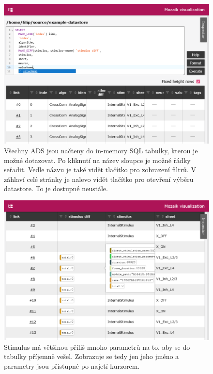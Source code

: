 \begin{figure}
	\centering
	\includegraphics[width=1\linewidth]{img/screenshot_navigator.png}
	\caption{Všechny ADS jsou načteny do in-memory SQL tabulky, kterou je možné dotazovat. Po kliknutí na název sloupce je možné řádky seřadit. Vedle názvu je také vidět tlačítko pro zobrazení filtrů. V záhlaví celé stránky je nalevo vidět tlačítko pro otevření výběru datastore. To je dostupné neustále.}
	\label{fig:navigator}
\end{figure}

\begin{figure}
	\centering
	\includegraphics[width=1\linewidth]{img/screenshot_stimulus.png}
	\caption{Stimulus má většinou příliš mnoho parametrů na to, aby se do tabulky příjemně vešel. Zobrazuje se tedy jen jeho jméno a parametry jsou přístupné po najetí kurzorem.}
	\label{fig:stimulus}
\end{figure}

